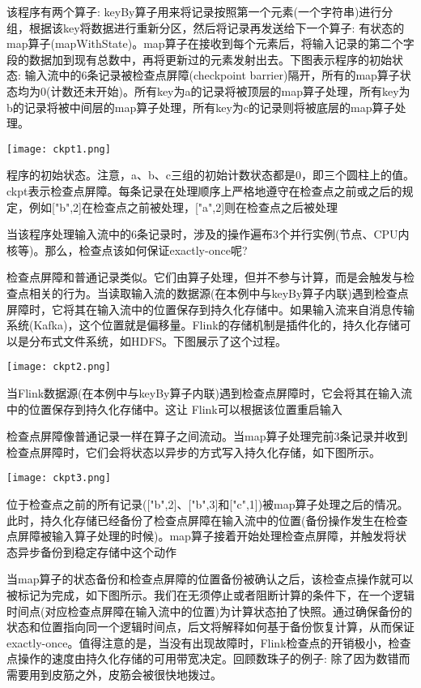 \documentclass[oneside]{ctexbook}
\begin{document}
该程序有两个算子: keyBy算子用来将记录按照第一个元素(一个字符串)进行分组，根据该key将数据进行重新分区，然后将记录再发送给下一个算子: 有状态的map算子(mapWithState)。map算子在接收到每个元素后，将输入记录的第二个字段的数据加到现有总数中，再将更新过的元素发射出去。下图表示程序的初始状态: 输入流中的6条记录被检查点屏障(checkpoint barrier)隔开，所有的map算子状态均为0(计数还未开始)。所有key为a的记录将被顶层的map算子处理，所有key为b的记录将被中间层的map算子处理，所有key为c的记录则将被底层的map算子处理。

\noindent \texttt{[image: ckpt1.png]}

程序的初始状态。注意，a、b、c三组的初始计数状态都是0，即三个圆柱上的值。ckpt表示检查点屏障。每条记录在处理顺序上严格地遵守在检查点之前或之后的规定，例如["b",2]在检查点之前被处理，["a",2]则在检查点之后被处理

当该程序处理输入流中的6条记录时，涉及的操作遍布3个并行实例(节点、CPU内核等)。那么，检查点该如何保证exactly-once呢?

检查点屏障和普通记录类似。它们由算子处理，但并不参与计算，而是会触发与检查点相关的行为。当读取输入流的数据源(在本例中与keyBy算子内联)遇到检查点屏障时，它将其在输入流中的位置保存到持久化存储中。如果输入流来自消息传输系统(Kafka)，这个位置就是偏移量。Flink的存储机制是插件化的，持久化存储可以是分布式文件系统，如HDFS。下图展示了这个过程。

\noindent \texttt{[image: ckpt2.png]}

当Flink数据源(在本例中与keyBy算子内联)遇到检查点屏障时，它会将其在输入流中的位置保存到持久化存储中。这让 Flink可以根据该位置重启输入

检查点屏障像普通记录一样在算子之间流动。当map算子处理完前3条记录并收到检查点屏障时，它们会将状态以异步的方式写入持久化存储，如下图所示。

\noindent \texttt{[image: ckpt3.png]}

位于检查点之前的所有记录(["b",2]、["b",3]和["c",1])被map算子处理之后的情况。此时，持久化存储已经备份了检查点屏障在输入流中的位置(备份操作发生在检查点屏障被输入算子处理的时候)。map算子接着开始处理检查点屏障，并触发将状态异步备份到稳定存储中这个动作

当map算子的状态备份和检查点屏障的位置备份被确认之后，该检查点操作就可以被标记为完成，如下图所示。我们在无须停止或者阻断计算的条件下，在一个逻辑时间点(对应检查点屏障在输入流中的位置)为计算状态拍了快照。通过确保备份的状态和位置指向同一个逻辑时间点，后文将解释如何基于备份恢复计算，从而保证exactly-once。值得注意的是，当没有出现故障时，Flink检查点的开销极小，检查点操作的速度由持久化存储的可用带宽决定。回顾数珠子的例子: 除了因为数错而需要用到皮筋之外，皮筋会被很快地拨过。
\end{document}

